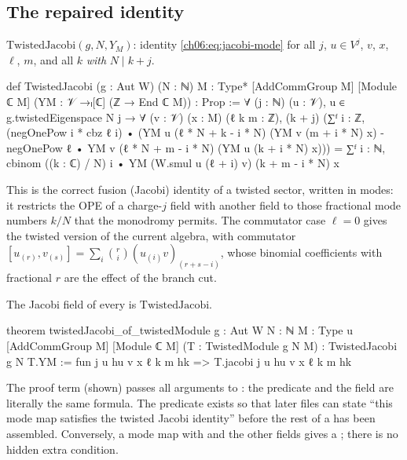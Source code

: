 \subsection{The repaired identity}

\begin{definition}\label{ch06:def:twjac}
$\mathrm{TwistedJacobi}(g,N,Y_M)$: identity \eqref{ch06:eq:jacobi-mode} for all $j$, $u\in V^j$,
$v$, $x$, $\ell$, $m$, and all $k$ \emph{with} $N\mid k+j$.
\end{definition}
\begin{leancode}
def TwistedJacobi (g : Aut W) (N : ℕ) {M : Type*} [AddCommGroup M] [Module ℂ M]
    (YM : 𝒱 →ₗ[ℂ] (ℤ → End ℂ M)) : Prop :=
  ∀ (j : ℕ) (u : 𝒱), u ∈ g.twistedEigenspace N j → ∀ (v : 𝒱) (x : M) (ℓ k m : ℤ),
    (k + j) %
    (∑ᶠ i : ℤ, (negOnePow i * cbz ℓ i) •
        (YM u (ℓ * N + k - i * N) (YM v (m + i * N) x)
          - negOnePow ℓ • YM v (ℓ * N + m - i * N) (YM u (k + i * N) x)))
      = ∑ᶠ i : ℕ, cbinom ((k : ℂ) / N) i • YM (W.smul u (ℓ + i) v) (k + m - i * N) x
\end{leancode}

\begin{physics}
This is the correct fusion (Jacobi) identity of a twisted sector, written in modes: it restricts the OPE of a charge-$j$ field with another field to those fractional mode numbers $k/N$ that the monodromy permits. The commutator case $\ell=0$ gives the twisted version of the current algebra, with commutator $[u_{(r)},v_{(s)}]=\sum_i\binom ri(u_{(i)}v)_{(r+s-i)}$, whose binomial coefficients with fractional $r$ are the effect of the branch cut.
\end{physics}
\begin{proposition}\label{ch06:prop:twjac}
The Jacobi field of every  is $\mathrm{TwistedJacobi}$.
\end{proposition}
\begin{leancode}
theorem twistedJacobi_of_twistedModule {g : Aut W} {N : ℕ} {M : Type u} [AddCommGroup M]
    [Module ℂ M] (T : TwistedModule g N M) : TwistedJacobi g N T.YM :=
  fun j u hu v x ℓ k m hk => T.jacobi j u hu v x ℓ k m hk
\end{leancode}
\begin{dictionary}
The proof term (shown) passes all arguments to : the predicate and the field are
literally the same formula.  The predicate exists so that later files can state ``this mode map
satisfies the twisted Jacobi identity'' before the rest of a  has been
assembled.  Conversely, a mode map with  and the other fields gives a
; there is no hidden extra condition.
\end{dictionary}

